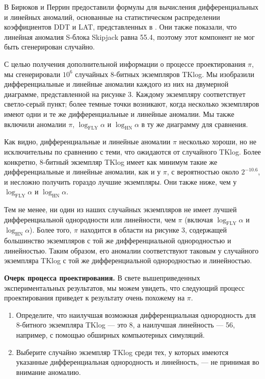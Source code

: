 В \cite{BP15} Бирюков и Перрин предоставили формулы для вычисления дифференциальных и
линейных аномалий, основанные на статистическом распределении коэффициентов DDT и LAT,
представленных в \cite{DR07}. Они также показали, что линейная аномалия S-блока Skipjack
равна 55.4, поэтому этот компонент не мог быть сгенерирован случайно.

С целью получения дополнительной информации о процессе проектирования \(\pi\), мы
сгенерировали \(10^6\) случайных 8-битных экземпляров TKlog. Мы изобразили дифференциальные
и линейные аномалии каждого из них на двумерной диаграмме, представленной на рисунке 3.
Каждому экземпляру соответствует светло-серый пункт; более темные точки возникают, когда
несколько экземпляров имеют одни и те же дифференциальные и линейные аномалии. Мы также
включили аномалии \(\pi\), \(\log_{\text{FLY}} \alpha\) и \(\log_{\text{HN}} \alpha\) в ту же
диаграмму для сравнения.

Как видно, дифференциальные и линейные аномалии \(\pi\) несколько хороши, но не
исключительны по сравнению с теми, что ожидаются от случайного TKlog. Более конкретно,
8-битный экземпляр TKlog имеет как минимум такие же дифференциальные и линейные аномалии,
как и у \(\pi\), с вероятностью около \(2^{-10.6}\), и несложно получить гораздо лучшие
экземпляры. Они также ниже, чем у \(\log_{\text{FLY}} \alpha\) и \(\log_{\text{HN}} \alpha\).

Тем не менее, ни один из наших случайных экземпляров не имеет лучшей дифференциальной
однородности или линейности, чем \(\pi\) (включая \(\log_{\text{FLY}} \alpha\) и
\(\log_{\text{HN}} \alpha\)). Более того, \(\pi\) находится в области на рисунке 3,
содержащей большинство экземпляров с той же дифференциальной однородностью и линейностью.
Таким образом, его аномалии соответствуют таковым у случайного экземпляра TKlog с той
же дифференциальной однородностью и линейностью.

\textbf{Очерк процесса проектирования.} В свете вышеприведенных экспериментальных
результатов, мы можем увидеть, что следующий процесс проектирования приведет к
результату очень похожему на \(\pi\).

\begin{enumerate}
  \item Определите, что наилучшая возможная дифференциальная однородность для 8-битного
  экземпляра TKlog — это 8, а наилучшая линейность — 56, например, с помощью
  обширных компьютерных симуляций.
  
  \item Выберите случайно экземпляр TKlog среди тех, у которых имеются указанные
  дифференциальная однородность и линейность, — не принимая во внимание аномалию.
\end{enumerate}

